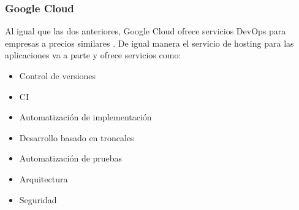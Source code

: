 		\subsubsection{Google Cloud}
			\begin{text}
				Al igual que las dos anteriores, Google Cloud ofrece servicios DevOps para empresas a precios similares \cite{GoogleCloud:online}. De igual manera el servicio de hosting para las aplicaciones va a parte y ofrece servicios como:
				\begin{itemize}
					\item Control de versiones
					\item CI
					\item Automatización de implementación
					\item Desarrollo basado en troncales
					\item Automatización de pruebas
					\item Arquitectura
					\item Seguridad
				\end{itemize}
			\end{text}	
	

